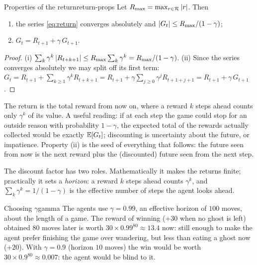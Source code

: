 \begin{proposition}{Properties of the return}{return-props}
  Let $R_{\max} = \max_{r \in \mathcal{R}} \left\lvert r \right\rvert$. Then
  \begin{enumerate}[nosep, label=(\roman*)]
    \item the series \eqref{eq:return} converges absolutely and
      $\left\lvert G_t \right\rvert \leq R_{\max} / (1 - \gamma)$;
    \item $G_t = R_{t+1} + \gamma\, G_{t+1}$.
  \end{enumerate}
\end{proposition}

\begin{proof}
  (i) $\sum_k \gamma^k \left\lvert R_{t+k+1} \right\rvert \leq R_{\max} \sum_k \gamma^k =
  R_{\max} / (1 - \gamma)$. (ii) Since the series converges absolutely we
  may split off its first term:
  $G_t = R_{t+1} + \sum_{k \geq 1} \gamma^k R_{t+k+1}
  = R_{t+1} + \gamma \sum_{j \geq 0} \gamma^j R_{t+1+j+1}
  = R_{t+1} + \gamma\, G_{t+1}$.
\end{proof}

\begin{intuition}
  The return is the total reward from now on, where a reward $k$ steps
  ahead counts only $\gamma^k$ of its value. A useful reading: if at each
  step the game could stop for an outside reason with probability $1 -
  \gamma$, the expected total of the rewards actually collected would be
  exactly $\mathbb{E}[G_t]$; discounting is uncertainty about the future, or
  impatience. Property (ii) is the seed of everything that follows: the
  future seen from now is the next reward plus the (discounted) future seen
  from the next step.
\end{intuition}

The discount factor has two roles. Mathematically it makes the returns
finite; practically it sets a \emph{horizon}: a reward $k$ steps ahead
counts $\gamma^k$, and $\sum_k \gamma^k = 1 / (1 - \gamma)$ is the
effective number of steps the agent looks ahead.

\begin{pacman}{Choosing $\gamma$}{gamma}
  The agents use $\gamma = 0.99$, an effective horizon of $100$ moves,
  about the length of a game. The reward of winning ($+30$ when no ghost is
  left) obtained $80$ moves later is worth $30 \times 0.99^{80} \approx 13.4$
  now: still enough
  to make the agent prefer finishing the game over wandering, but less than
  eating a ghost now ($+20$). With $\gamma = 0.9$ (horizon $10$ moves) the
  win would be worth $30 \times 0.9^{80} \approx 0.007$: the agent would
  be blind to it.
\end{pacman}

